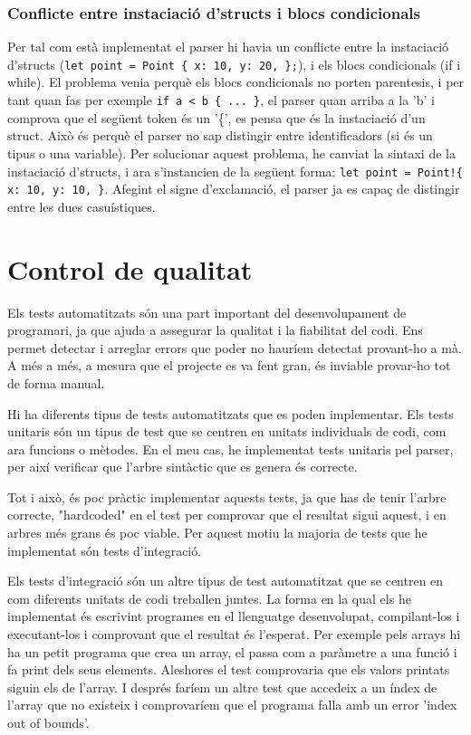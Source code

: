 ﻿\documentclass{article}
\begin{document}
\subsubsection{Conflicte entre instaciació d'structs i blocs condicionals}
Per tal com està implementat el parser hi havia un conflicte entre la 
instaciació d'structs (\texttt{let point = Point \{ x: 10, y: 20, \};}), i els
blocs condicionals (if i while). El problema venia perquè els blocs condicionals
no porten parentesis, i per tant quan fas per exemple \texttt{if a < b \{ ... \}},
el parser quan arriba a la 'b' i comprova que el següent token és un '\{', es 
pensa que és la instaciació d'un struct. Això és perquè el parser no sap 
distingir entre identificadors (si és un tipus o una variable). Per solucionar
aquest problema, he canviat la sintaxi de la instaciació d'structs, i ara 
s'instancien de la següent forma: \texttt{let point = Point!\{ x: 10, y: 10, \}}.
Afegint el signe d'exclamació, el parser ja es capaç de distingir entre les dues
casuístiques.

\section{Control de qualitat}
Els tests automatitzats són una part important del desenvolupament de
programari, ja que ajuda a assegurar la qualitat i la fiabilitat del codi. Ens
permet detectar i arreglar errors que poder no hauríem detectat provant-ho a mà.
A més a més, a mesura que el projecte es va fent gran, és inviable provar-ho tot
de forma manual.

Hi ha diferents tipus de tests automatitzats que es poden implementar. Els tests
unitaris són un tipus de test que se centren en unitats individuals de codi, com
ara funcions o mètodes. En el meu cas, he implementat tests unitaris pel parser,
per així verificar que l'arbre sintàctic que es genera és correcte. 

Tot i això, és poc pràctic implementar aquests tests, ja que has de tenir
l'arbre correcte, "hardcoded" en el test per comprovar que el resultat sigui
aquest, i en arbres més grans és poc viable. Per aquest motiu la majoria de
tests que he implementat són tests d'integració.

Els tests d'integració són un altre tipus de test automatitzat que se centren en
com diferents unitats de codi treballen juntes. La forma en la qual els he 
implementat és escrivint programes en el llenguatge desenvolupat, compilant-los 
i executant-los i comprovant que el resultat és l'esperat. Per exemple pels 
arrays hi ha un petit programa que crea un array, el passa com a paràmetre a una
funció i fa print dels seus elements. Aleshores el test comprovaria que els 
valors printats siguin els de l'array. I després faríem un altre test que 
accedeix a un índex de l'array que no existeix i comprovaríem que el programa 
falla amb un error 'index out of bounds'.
\end{document}
